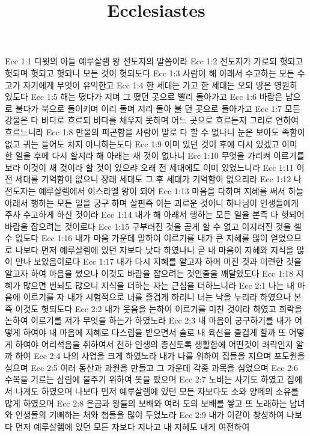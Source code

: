 

\title{Ecclesiastes}

Ecc 1:1  다윗의 아들 예루살렘 왕 전도자의 말씀이라
Ecc 1:2  전도자가 가로되 헛되고 헛되며 헛되고 헛되니 모든 것이 헛되도다
Ecc 1:3  사람이 해 아래서 수고하는 모든 수고가 자기에게 무엇이 유익한고
Ecc 1:4  한 세대는 가고 한 세대는 오되 땅은 영원히 있도다
Ecc 1:5  해는 떴다가 지며 그 떴던 곳으로 빨리 돌아가고
Ecc 1:6  바람은 남으로 불다가 북으로 돌이키며 이리 돌며 저리 돌아 불 던 곳으로 돌아가고
Ecc 1:7  모든 강물은 다 바다로 흐르되 바다를 채우지 못하며 어느 곳으로 흐르든지 그리로 연하여 흐르느니라
Ecc 1:8  만물의 피곤함을 사람이 말로 다 할 수 없나니 눈은 보아도 족함이 없고 귀는 들어도 차지 아니하는도다
Ecc 1:9  이미 있던 것이 후에 다시 있겠고 이미 한 일을 후에 다시 할지라 해 아래는 새 것이 없나니
Ecc 1:10  무엇을 가리켜 이르기를 보라 이것이 새 것이라 할 것이 있으랴 오래 전 세대에도 이미 있었느니라
Ecc 1:11  이전 세대를 기억함이 없으니 장래 세대도 그 후 세대가 기억함이 없으리라
Ecc 1:12  나 전도자는 예루살렘에서 이스라엘 왕이 되어
Ecc 1:13  마음을 다하며 지혜를 써서 하늘 아래서 행하는 모든 일을 궁구 하며 살핀즉 이는 괴로운 것이니 하나님이 인생들에게 주사 수고하게 하신 것이라
Ecc 1:14  내가 해 아래서 행하는 모든 일을 본즉 다 헛되어 바람을 잡으려는 것이로다
Ecc 1:15  구부러진 것을 곧게 할 수 없고 이지러진 것을 셀 수 없도다
Ecc 1:16  내가 마음 가운데 말하여 이르기를 내가 큰 지혜를 많이 얻었으므로 나보다 먼저 예루살렘에 있던 자보다 낫다 하였나니 곧 내 마음이 지혜와 지식을 많이 만나 보았음이로다
Ecc 1:17  내가 다시 지혜를 알고자 하며 미친 것과 미련한 것을 알고자 하여 마음을 썼으나 이것도 바람을 잡으려는 것인줄을 깨달았도다
Ecc 1:18  지혜가 많으면 번뇌도 많으니 지식을 더하는 자는 근심을 더하느니라
Ecc 2:1  나는 내 마음에 이르기를 자 내가 시험적으로 너를 즐겁게 하리니 너는 낙을 누리라 하였으나 본즉 이것도 헛되도다
Ecc 2:2  내가 웃음을 논하여 이르기를 미친 것이라 하였고 희락을 논하여 이르기를 저가 무엇을 하는가 하였노라
Ecc 2:3  내 마음이 궁구하기를 내가 어떻게 하여야 내 마음에 지혜로 다스림을 받으면서 술로 내 육신을 즐겁게 할까 또 어떻게 하여야 어리석음을 취하여서 천하 인생의 종신토록 생활함에 어떤것이 쾌락인지 알까 하여
Ecc 2:4  나의 사업을 크게 하였노라 내가 나를 위하여 집들을 지으며 포도원을 심으며
Ecc 2:5  여러 동산과 과원을 만들고 그 가운데 각종 과목을 심었으며
Ecc 2:6  수목을 기르는 삼림에 물주기 위하여 못을 팠으며
Ecc 2:7  노비는 사기도 하였고 집에서 나게도 하였으며 나보다 먼저 예루살렘에 있던 모든 자보다도 소와 양떼의 소유를 많게 하였으며
Ecc 2:8  은금과 왕들의 보배와 여러 도의 보배를 쌓고 또 노래하는 남녀와 인생들의 기뻐하는 처와 첩들을 많이 두었노라
Ecc 2:9  내가 이같이 창성하여 나보다 먼저 예루살렘에 있던 모든 자보다 지나고 내 지혜도 내게 여전하여
